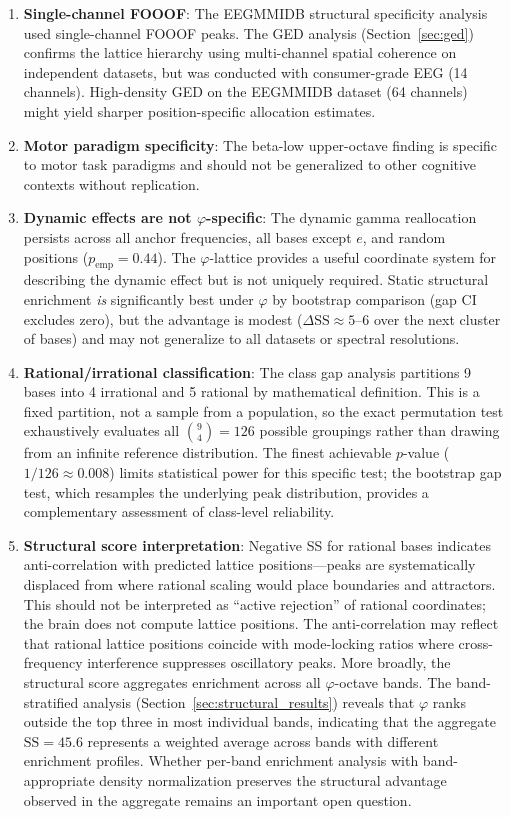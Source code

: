 \documentclass[11pt,a4paper]{article}
\newcommand{\phisym}{\varphi}
\begin{document}
\begin{enumerate}
    \item \textbf{Single-channel FOOOF}: The EEGMMIDB structural specificity analysis used single-channel FOOOF peaks. The GED analysis (Section~\ref{sec:ged}) confirms the lattice hierarchy using multi-channel spatial coherence on independent datasets, but was conducted with consumer-grade EEG (14 channels). High-density GED on the EEGMMIDB dataset (64 channels) might yield sharper position-specific allocation estimates.

    \item \textbf{Motor paradigm specificity}: The beta-low upper-octave finding is specific to motor task paradigms and should not be generalized to other cognitive contexts without replication.

    \item \textbf{Dynamic effects are not $\phisym$-specific}: The dynamic gamma reallocation persists across all anchor frequencies, all bases except $e$, and random positions ($p_{\text{emp}} = 0.44$). The $\phisym$-lattice provides a useful coordinate system for describing the dynamic effect but is not uniquely required. Static structural enrichment \emph{is} significantly best under $\phisym$ by bootstrap comparison (gap CI excludes zero), but the advantage is modest ($\Delta\text{SS} \approx 5$--$6$ over the next cluster of bases) and may not generalize to all datasets or spectral resolutions.

    \item \textbf{Rational/irrational classification}: The class gap analysis partitions 9 bases into 4 irrational and 5 rational by mathematical definition. This is a fixed partition, not a sample from a population, so the exact permutation test exhaustively evaluates all $\binom{9}{4} = 126$ possible groupings rather than drawing from an infinite reference distribution. The finest achievable $p$-value ($1/126 \approx 0.008$) limits statistical power for this specific test; the bootstrap gap test, which resamples the underlying peak distribution, provides a complementary assessment of class-level reliability.

    \item \textbf{Structural score interpretation}: Negative SS for rational bases indicates anti-correlation with predicted lattice positions---peaks are systematically displaced from where rational scaling would place boundaries and attractors. This should not be interpreted as ``active rejection'' of rational coordinates; the brain does not compute lattice positions. The anti-correlation may reflect that rational lattice positions coincide with mode-locking ratios where cross-frequency interference suppresses oscillatory peaks. More broadly, the structural score aggregates enrichment across all $\phisym$-octave bands. The band-stratified analysis (Section~\ref{sec:structural_results}) reveals that $\phisym$ ranks outside the top three in most individual bands, indicating that the aggregate $\text{SS} = 45.6$ represents a weighted average across bands with different enrichment profiles. Whether per-band enrichment analysis with band-appropriate density normalization preserves the structural advantage observed in the aggregate remains an important open question.


\end{enumerate}
\end{document}
